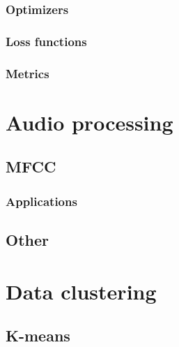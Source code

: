 \subsubsection{Optimizers}

\subsubsection{Loss functions}

\subsubsection{Metrics}

\section{Audio processing}

\subsection{MFCC}


\subsubsection{Applications}

\subsection{Other}

\section{Data clustering}

\subsection{K-means}


